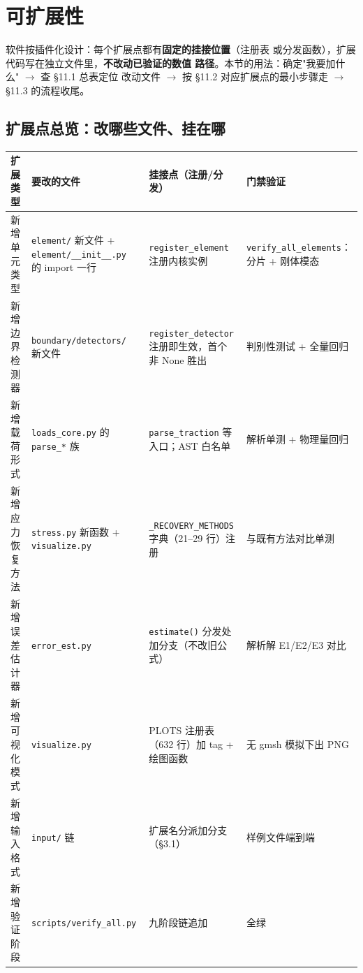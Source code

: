 \documentclass[12pt,a4paper]{ctexart}
\begin{document}
\section{可扩展性}

软件按插件化设计：每个扩展点都有\textbf{固定的挂接位置}（注册表
或分发函数），扩展代码写在独立文件里，\textbf{不改动已验证的数值
路径}。本节的用法：确定"我要加什么" $\rightarrow$ 查 §11.1 总表定位
改动文件 $\rightarrow$ 按 §11.2 对应扩展点的最小步骤走 $\rightarrow$
§11.3 的流程收尾。

\subsection{扩展点总览：改哪些文件、挂在哪}

\begin{longtable}{p{3.0cm}p{4.2cm}p{3.7cm}p{3.1cm}}
\toprule
\textbf{扩展类型} & \textbf{要改的文件} & \textbf{挂接点（注册/分发）} & \textbf{门禁验证} \\
\midrule
新增单元类型 & \texttt{element/} 新文件 + \texttt{element/}\allowbreak\texttt{\_\_init\_\_.py} 的 import 一行 & \texttt{register\_}\allowbreak\texttt{element} 注册内核实例 & \texttt{verify\_all\_}\allowbreak\texttt{elements}：分片 + 刚体模态 \\
新增边界检测器 & \texttt{boundary/}\allowbreak\texttt{detectors/} 新文件 & \texttt{register\_}\allowbreak\texttt{detector} 注册即生效，首个非 None 胜出 & 判别性测试 + 全量回归 \\
新增载荷形式 & \texttt{loads\_core.py} 的 \texttt{parse\_*} 族 & \texttt{parse\_traction} 等入口；AST 白名单 & 解析单测 + 物理量回归 \\
新增应力恢复方法 & \texttt{stress.py} 新函数 + \texttt{visualize.py} & \texttt{\_RECOVERY\_}\allowbreak\texttt{METHODS} 字典（21--29 行）注册 & 与既有方法对比单测 \\
新增误差估计器 & \texttt{error\_est.py} & \texttt{estimate()} 分发处加分支（不改旧公式） & 解析解 E1/E2/E3 对比 \\
新增可视化模式 & \texttt{visualize.py} & PLOTS 注册表（632 行）加 tag + 绘图函数 & 无 gmsh 模拟下出 PNG \\
新增输入格式 & \texttt{input/} 链 & 扩展名分派加分支（§3.1） & 样例文件端到端 \\
新增验证阶段 & \texttt{scripts/}\allowbreak\texttt{verify\_all.py} & 九阶段链追加 & 全绿 \\
\bottomrule
\end{longtable}
\normalsize
\end{document}
